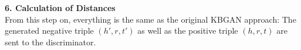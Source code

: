 \textbf{6. Calculation of Distances}\\
From this step on, everything is the same as the original \ac{KBGAN} approach:
The generated negative triple $(h',r,t')$ as well as the positive triple $(h, r, t)$ are sent to the discriminator.